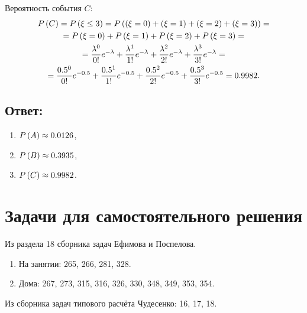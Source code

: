 Вероятность события $C$:
\begin{multline}
    P \left ( C \right )
    = P \left ( \xi \le 3 \right )
    = P \left ( \left ( \xi = 0 \right ) + \left ( \xi = 1 \right ) + \left ( \xi = 2 \right ) + \left ( \xi = 3 \right ) \right ) = \\
    = P \left ( \xi = 0 \right ) + P \left ( \xi = 1 \right ) + P \left ( \xi = 2 \right ) + P \left ( \xi = 3 \right ) = \\
    = \frac{\lambda^0}{0!} e^{-\lambda} + \frac{\lambda^1}{1!} e^{-\lambda} + \frac{\lambda^2}{2!} e^{-\lambda} + \frac{\lambda^3}{3!} e^{-\lambda} = \\
    = \frac{0.5^0}{0!} e^{-0.5} + \frac{0.5^1}{1!} e^{-0.5} + \frac{0.5^2}{2!} e^{-0.5} + \frac{0.5^3}{3!} e^{-0.5}
    = 0.9982 .
\end{multline}

\subsection*{Ответ:}
\begin{enumerate}
    \item $P \left ( A \right ) \approx 0.0126$,
    \item $P \left ( B \right ) \approx 0.3935$,
    \item $P \left ( C \right ) \approx 0.9982$.
\end{enumerate}

\section*{Задачи для самостоятельного решения}

Из раздела 18 сборника задач Ефимова и Поспелова.
\begin{enumerate}
    \item На занятии: 265, 266, 281, 328.
    \item Дома: 267, 273, 315, 316, 326, 330, 348, 349, 353, 354.
\end{enumerate}

Из сборника задач типового расчёта Чудесенко: 16, 17, 18.